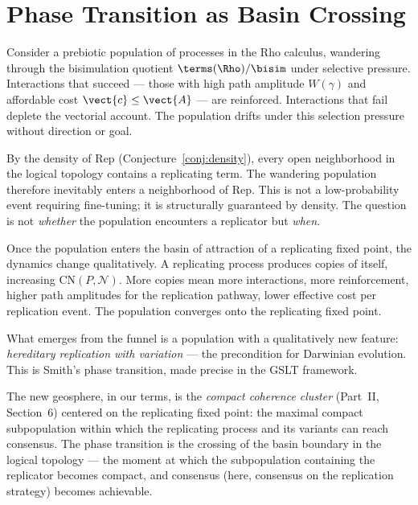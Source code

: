 \section{Phase Transition as Basin Crossing}

\begin{remark}
Consider a prebiotic population of processes in the Rho calculus,
wandering through the bisimulation quotient $\terms(\Rho)/{\bisim}$
under selective pressure.
Interactions that succeed --- those with high path amplitude
$W(\gamma)$ and affordable cost $\vect{c} \leq \vect{A}$ ---
are reinforced.
Interactions that fail deplete the vectorial account.
The population drifts under this selection pressure without
direction or goal.
\end{remark}

\begin{remark}
By the density of $\mathrm{Rep}$ (Conjecture~\ref{conj:density}),
every open neighborhood in the logical topology contains a
replicating term.
The wandering population therefore inevitably enters a neighborhood
of $\mathrm{Rep}$.
This is not a low-probability event requiring fine-tuning; it is
structurally guaranteed by density.
The question is not \emph{whether} the population encounters a
replicator but \emph{when}.
\end{remark}

\begin{remark}
Once the population enters the basin of attraction of a replicating
fixed point, the dynamics change qualitatively.
A replicating process produces copies of itself, increasing
$\mathrm{CN}(P, \mathcal{N})$.
More copies mean more interactions, more reinforcement, higher
path amplitudes for the replication pathway, lower effective cost
per replication event.
The population converges onto the replicating fixed point.

What emerges from the funnel is a population with a qualitatively
new feature: \emph{hereditary replication with variation} ---
the precondition for Darwinian evolution.
This is Smith's phase transition, made precise in the GSLT
framework.

The new geosphere, in our terms, is the \emph{compact coherence
cluster} (Part~II, Section~6) centered on the replicating fixed
point: the maximal compact subpopulation within which the
replicating process and its variants can reach consensus.
The phase transition is the crossing of the basin boundary in
the logical topology --- the moment at which the subpopulation
containing the replicator becomes compact, and consensus (here,
consensus on the replication strategy) becomes achievable.
\end{remark}

